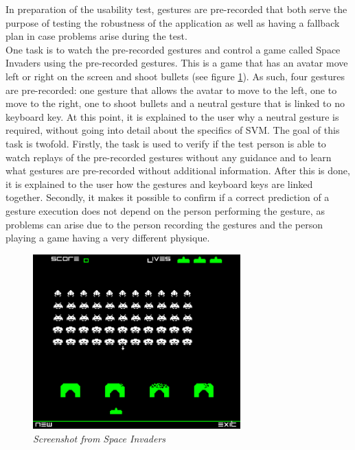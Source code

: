 In preparation of the usability test, gestures are pre-recorded that both serve the purpose of testing the robustness of the application as well as having a fallback plan in case problems arise during the test.\\

One task is to watch the pre-recorded gestures and control a game called Space Invaders using the pre-recorded gestures. This is a game that has an avatar move left or right on the screen and shoot bullets (see figure \ref{fig: space_invaders}). As such, four gestures are pre-recorded: one gesture that allows the avatar to move to the left, one to move to the right, one to shoot bullets and a neutral gesture that is linked to no keyboard key. At this point, it is explained to the user why a neutral gesture is required, without going into detail about the specifics of SVM. The goal of this task is twofold. Firstly, the task is used to verify if the test person is able to watch replays of the pre-recorded gestures without any guidance and to learn what gestures are pre-recorded without additional information. After this is done, it is explained to the user how the gestures and keyboard keys are linked together. Secondly, it makes it possible to confirm if a correct prediction of a gesture execution does not depend on the person performing the gesture, as problems can arise due to the person recording the gestures and the person playing a game having a very different physique.\\

\begin{figure}[H]
\begin{center}
\includegraphics[width=8cm]{SpaceInvaders.png}
\caption{\emph{Screenshot from Space Invaders}}
\label{fig: space_invaders}
\end{center}
\end{figure}

